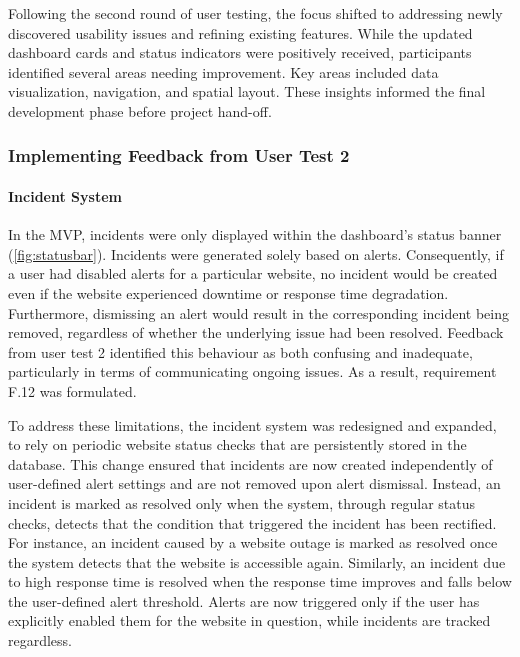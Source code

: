 Following the second round of user testing, the focus shifted to addressing newly discovered usability issues and refining existing features. While the updated dashboard cards and status indicators were positively received, participants identified several areas needing improvement. Key areas included data visualization, navigation, and spatial layout. These insights informed the final development phase before project hand-off.

\subsubsection{Implementing Feedback from User Test 2}

\paragraph{Incident System}
In the \acrshort{MVP}, incidents were only displayed within the dashboard's status banner (\autoref{fig:statusbar}). Incidents were generated solely based on alerts. Consequently, if a user had disabled alerts for a particular website, no incident would be created even if the website experienced downtime or response time degradation. Furthermore, dismissing an alert would result in the corresponding incident being removed, regardless of whether the underlying issue had been resolved. Feedback from user test 2 identified this behaviour as both confusing and inadequate, particularly in terms of communicating ongoing issues. As a result, requirement F.12 was formulated.

To address these limitations, the incident system was redesigned and expanded, to rely on periodic website status checks that are persistently stored in the \gls{database}. This change ensured that incidents are now created independently of user-defined alert settings and are not removed upon alert dismissal. Instead, an incident is marked as resolved only when the system, through regular status checks, detects that the condition that triggered the incident has been rectified. For instance, an incident caused by a website outage is marked as resolved once the system detects that the website is accessible again. Similarly, an incident due to high response time is resolved when the response time improves and falls below the user-defined alert threshold. Alerts are now triggered only if the user has explicitly enabled them for the website in question, while incidents are tracked regardless.

